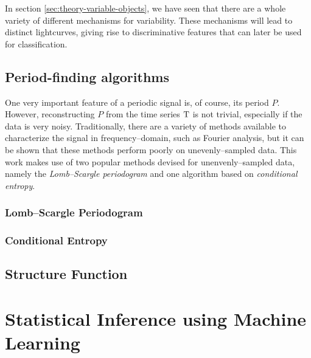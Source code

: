 In section \ref{sec:theory-variable-objects}, we have seen that there are a whole variety of different mechanisms for variability. These mechanisms will lead to distinct lightcurves, giving rise to discriminative features that can later be used for classification.

\subsection{Period-finding algorithms}

One very important feature of a periodic signal is, of course, its period $P$. However, reconstructing $P$ from the time series $\mathrm{T}$ is not trivial, especially if the data is very noisy. Traditionally, there are a variety of methods available to characterize the signal in frequency--domain, such as Fourier analysis, but it can be shown that these methods perform poorly on unevenly--sampled data. This work makes use of two popular methods devised for unenvenly--sampled data, namely the \emph{Lomb--Scargle periodogram} and one algorithm based on \emph{conditional entropy}.

\subsubsection{Lomb--Scargle Periodogram}



\subsubsection{Conditional Entropy}


\subsection{Structure Function}

\section{Statistical Inference using Machine Learning}

